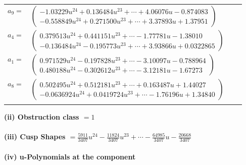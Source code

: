 \documentclass[1p]{elsarticle_modified}
\theoremstyle{definition}
\begin{document}
\begin{tabular}{m{7pt} m{180pt} m{7pt} m{180pt} }
\flushright $a_{9}=$&$\begin{pmatrix}-1.03229 u^{24}+0.136484 u^{23}+\cdots+4.06076 u-0.874083\\-0.558849 u^{24}+0.271500 u^{23}+\cdots+3.37893 u+1.37951\end{pmatrix}$ \\
\flushright $a_{4}=$&$\begin{pmatrix}0.379513 u^{24}+0.441151 u^{23}+\cdots-1.77781 u-1.38010\\-0.136484 u^{24}-0.195773 u^{23}+\cdots+3.93866 u+0.0322865\end{pmatrix}$ \\
\flushright $a_{1}=$&$\begin{pmatrix}0.971529 u^{24}-0.197828 u^{23}+\cdots-3.10097 u-0.788964\\0.480188 u^{24}-0.302612 u^{23}+\cdots-3.12181 u-1.67273\end{pmatrix}$ \\
\flushright $a_{8}=$&$\begin{pmatrix}0.502495 u^{24}+0.512181 u^{23}+\cdots+0.163487 u+1.44027\\-0.0636924 u^{24}+0.0419724 u^{23}+\cdots-1.76196 u+1.34840\end{pmatrix}$\\&\end{tabular}
\flushleft \textbf{(ii) Obstruction class $= 1$}\\~\\
\flushleft \textbf{(iii) Cusp Shapes $= \frac{5911}{3407} u^{24}-\frac{11824}{3407} u^{23}+\cdots-\frac{64985}{3407} u-\frac{20668}{3407}$}\\~\\
\newpage\renewcommand{\arraystretch}{1}
\flushleft \textbf{(iv) u-Polynomials at the component}\newline \\
\end{document}
